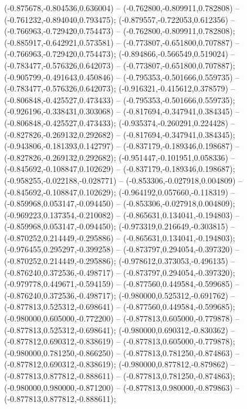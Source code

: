  (-0.875678,-0.804536,0.636004) -- (-0.762800,-0.809911,0.782808) -- (-0.761232,-0.894040,0.793475);
 (-0.879557,-0.722053,0.612356) -- (-0.766963,-0.729420,0.754473) -- (-0.762800,-0.809911,0.782808);
 (-0.885917,-0.642921,0.573581) -- (-0.773807,-0.651800,0.707887) -- (-0.766963,-0.729420,0.754473);
 (-0.894866,-0.566549,0.519024) -- (-0.783477,-0.576326,0.642073) -- (-0.773807,-0.651800,0.707887);
 (-0.905799,-0.491643,0.450846) -- (-0.795353,-0.501666,0.559735) -- (-0.783477,-0.576326,0.642073);
 (-0.916321,-0.415612,0.378579) -- (-0.806848,-0.425527,0.473433) -- (-0.795353,-0.501666,0.559735);
 (-0.926196,-0.338431,0.303068) -- (-0.817694,-0.347941,0.384345) -- (-0.806848,-0.425527,0.473433);
 (-0.935374,-0.260291,0.224428) -- (-0.827826,-0.269132,0.292682) -- (-0.817694,-0.347941,0.384345);
 (-0.943806,-0.181393,0.142797) -- (-0.837179,-0.189346,0.198687) -- (-0.827826,-0.269132,0.292682);
 (-0.951447,-0.101951,0.058336) -- (-0.845692,-0.108847,0.102629) -- (-0.837179,-0.189346,0.198687);
 (-0.958255,-0.022188,-0.028771) -- (-0.853306,-0.027918,0.004809) -- (-0.845692,-0.108847,0.102629);
 (-0.964192,0.057660,-0.118319) -- (-0.859968,0.053147,-0.094450) -- (-0.853306,-0.027918,0.004809);
 (-0.969223,0.137354,-0.210082) -- (-0.865631,0.134041,-0.194803) -- (-0.859968,0.053147,-0.094450);
 (-0.973319,0.216649,-0.303815) -- (-0.870252,0.214449,-0.295886) -- (-0.865631,0.134041,-0.194803);
 (-0.976455,0.295297,-0.399258) -- (-0.873797,0.294054,-0.397320) -- (-0.870252,0.214449,-0.295886);
 (-0.978612,0.373053,-0.496135) -- (-0.876240,0.372536,-0.498717) -- (-0.873797,0.294054,-0.397320);
 (-0.979778,0.449671,-0.594159) -- (-0.877560,0.449584,-0.599685) -- (-0.876240,0.372536,-0.498717);
 (-0.980000,0.525312,-0.691762) -- (-0.877813,0.525312,-0.698641) -- (-0.877560,0.449584,-0.599685);
 (-0.980000,0.605000,-0.772200) -- (-0.877813,0.605000,-0.779878) -- (-0.877813,0.525312,-0.698641);
 (-0.980000,0.690312,-0.830362) -- (-0.877812,0.690312,-0.838619) -- (-0.877813,0.605000,-0.779878);
 (-0.980000,0.781250,-0.866250) -- (-0.877813,0.781250,-0.874863) -- (-0.877812,0.690312,-0.838619);
 (-0.980000,0.877812,-0.879862) -- (-0.877813,0.877812,-0.888611) -- (-0.877813,0.781250,-0.874863);
 (-0.980000,0.980000,-0.871200) -- (-0.877813,0.980000,-0.879863) -- (-0.877813,0.877812,-0.888611);
